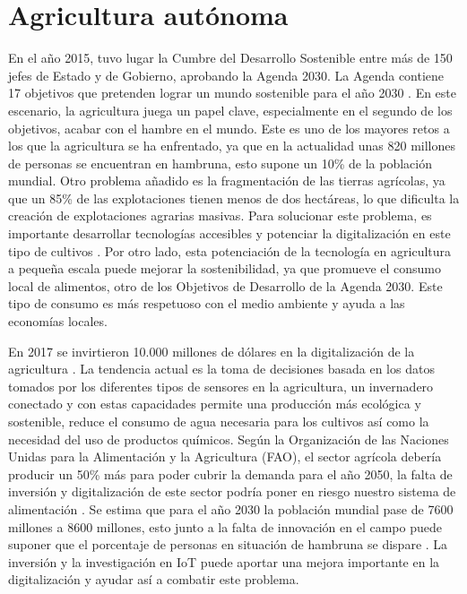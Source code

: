 \documentclass[a4paper, 12pt, oneside]{book}
\begin{document}
\section{Agricultura autónoma}
\label{sec:agricultura autonoma}
En el año 2015, tuvo lugar la Cumbre del Desarrollo Sostenible entre más de 150 jefes de Estado y de Gobierno, aprobando  la Agenda 2030. La Agenda contiene 17 objetivos que pretenden lograr un mundo sostenible para el año 2030 \cite{agenda}. En este escenario, la agricultura juega un papel clave, especialmente en el segundo de los objetivos, acabar con el hambre en el mundo. Este es uno de los mayores retos a los que la agricultura se ha enfrentado, ya que en la actualidad unas 820 millones de personas se encuentran en hambruna, esto supone un 10\% de la población mundial. Otro problema añadido es la fragmentación de las tierras agrícolas, ya que un 85\% de las explotaciones tienen menos de dos hectáreas, lo que dificulta la creación de explotaciones agrarias masivas. Para solucionar este problema, es importante desarrollar tecnologías accesibles y potenciar la digitalización en este tipo de cultivos \cite{papel_agricultura}. Por otro lado, esta potenciación de la tecnología en agricultura a pequeña escala puede mejorar la sostenibilidad, ya que promueve el consumo local de alimentos, otro de los Objetivos de Desarrollo de la Agenda 2030. Este tipo de consumo es más respetuoso con el medio ambiente y ayuda a las economías locales.

En 2017 se invirtieron 10.000 millones de dólares en la digitalización de la agricultura \cite{connected_greenhouses}. La tendencia actual es la toma de decisiones basada en los datos tomados por los diferentes tipos de sensores en la agricultura, un invernadero conectado y con estas capacidades permite una producción más ecológica y sostenible, reduce el consumo de agua necesaria para los cultivos así como la necesidad del uso de productos químicos.
Según la Organización de las Naciones Unidas para la Alimentación y la Agricultura (FAO), el sector agrícola debería producir un 50\% más para poder cubrir la demanda para el año 2050, la falta de inversión y digitalización de este sector podría poner en riesgo nuestro sistema de alimentación \cite{alimentos_2050}. Se estima que para el año 2030 la población mundial pase de 7600 millones a 8600 millones, esto junto a la falta de innovación en el campo puede suponer que el porcentaje de personas en situación de hambruna se dispare \cite{poblacion_mundial}. La inversión y la investigación en IoT puede aportar una mejora importante en la digitalización y ayudar así a combatir este problema.
\end{document}
